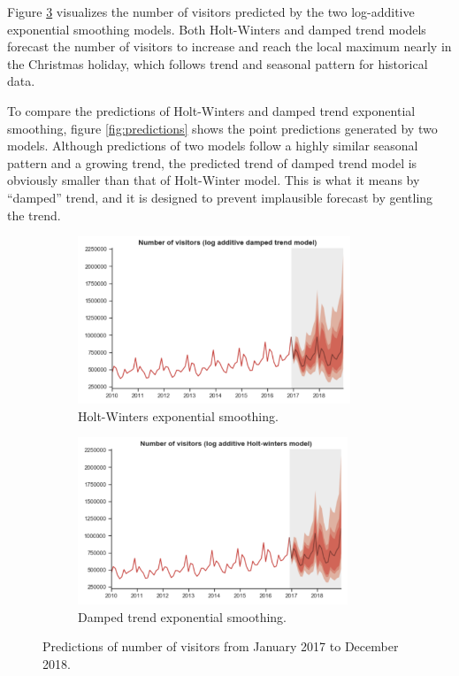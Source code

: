 \documentclass[letterpaper,12pt,twoside,]{pinp}
\begin{document}
Figure \ref{fig:pred} visualizes the number of visitors predicted by the
two log-additive exponential smoothing models. Both Holt-Winters and
damped trend models forecast the number of visitors to increase and
reach the local maximum nearly in the Christmas holiday, which follows
trend and seasonal pattern for historical data.

To compare the predictions of Holt-Winters and damped trend exponential
smoothing, figure \ref{fig:predictions} shows the point predictions
generated by two models. Although predictions of two models follow a
highly similar seasonal pattern and a growing trend, the predicted trend
of damped trend model is obviously smaller than that of Holt-Winter
model. This is what it means by ``damped'' trend, and it is designed to
prevent implausible forecast by gentling the trend.

\begin{figure}[h]
\begin{subfigure}{0.5\textwidth}
\includegraphics[width=0.9\linewidth, height=5cm]{hw_pred} 
\caption{Holt-Winters exponential smoothing.}
\label{fig:hw_pred}
\end{subfigure}
\begin{subfigure}{0.5\textwidth}
\includegraphics[width=0.9\linewidth, height=5cm]{damped_pred}
\caption{Damped trend exponential smoothing.}
\label{fig:damped_pred}
\end{subfigure}
\caption{Predictions of number of visitors from January 2017 to December 2018.}
\label{fig:pred}
\end{figure}
\end{document}
